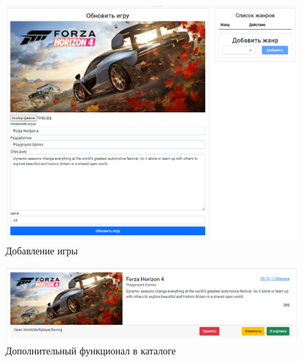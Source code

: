 \begin{figure}[ht]
	\centering
	  \includegraphics[scale=0.32]{attachments/addgame.png}  
	  \caption{ Добавление игры }
	  \label{sec:user_guide:admin:addgame}
\end{figure}
\clearpage
\begin{figure}[!ht]
	\centering
	  \includegraphics[scale=0.4]{attachments/catalog.png}  
	  \caption{ Дополнительный функционал в каталоге }
	  \label{sec:user_guide:admin:catalog}
\end{figure}
